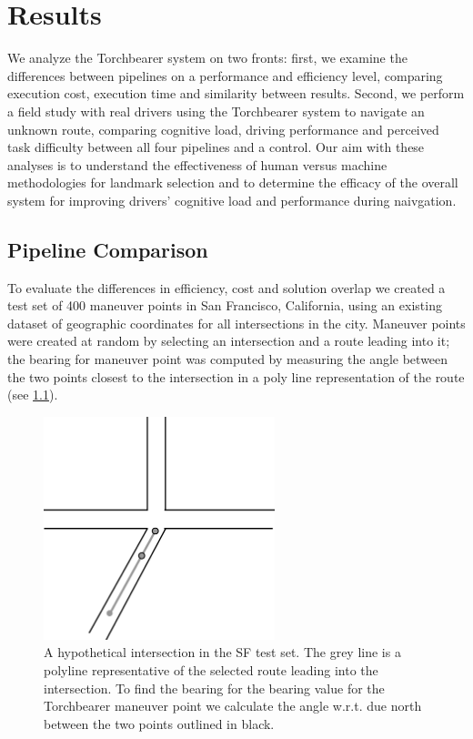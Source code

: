 \chapter{Results}\label{CH:results}

We analyze the Torchbearer system on two fronts: first, we examine the differences between pipelines on a performance and efficiency level, comparing execution cost, execution time and similarity between results. Second, we perform a field study with real drivers using the Torchbearer system to navigate an unknown route, comparing cognitive load, driving performance and perceived task difficulty between all four pipelines and a control. Our aim with these analyses is to understand the effectiveness of human versus machine methodologies for landmark selection and to determine the efficacy of the overall system for improving drivers' cognitive load and performance during naivgation.

\section{Pipeline Comparison}

To evaluate the differences in efficiency, cost and solution overlap we created a test set of 400 maneuver points in San Francisco, California, using an existing dataset \cite{sfIntersections} of geographic coordinates for all intersections in the city. Maneuver points were created at random by selecting an intersection and a route leading into it; the bearing for maneuver point was computed by measuring the angle between the two points closest to the intersection in a poly line representation of the route (see \ref{fig:polyline}).

\begin{figure}[htbp]
  \centering
  \includegraphics[width=0.6\textwidth]{images/POLYLINE.pdf}
  \caption{A hypothetical intersection in the SF test set. The grey line is a polyline representative of the selected route leading into the intersection. To find the bearing for the bearing value for the Torchbearer maneuver point we calculate the angle w.r.t. due north between the two points outlined in black.}
  \label{fig:polyline}
\end{figure}

